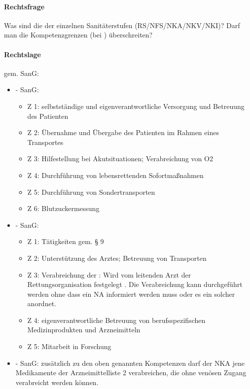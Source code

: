 \paragraph*{Rechtsfrage}

Was sind die  der einzelnen Sanitäterstufen
(RS/NFS/NKA/NKV/NKI)? Darf man die Kompetenzgrenzen (bei ) \"uberschreiten?

\paragraph*{Rechtslage}

 gem.  SanG:

\begin{itemize}
	\item {\mdseries
	 -  SanG:}

	\begin{itemize}
		\item {\mdseries
		Z 1: selbstständige und eigenverantwortliche Versorgung und Betreuung
		des Patienten}

		\item {\mdseries
		Z 2: \"Ubernahme und \"Ubergabe des Patienten im Rahmen
		eines Transportes}

		\item {\mdseries
		Z 3: Hilfestellung bei Akutsituationen; Verabreichung von O2}

		\item {\mdseries
		Z 4: Durchf\"uhrung von lebensrettenden Sofortma{\ss}nahmen}

		\item {\mdseries
		Z 5: Durchf\"uhrung von Sondertransporten}

		\item {\mdseries
		Z 6: Blutzuckermessung}

	\end{itemize}

	\item {} -  SanG:

	\begin{itemize}
		\item Z 1: Tätigkeiten gem. {\S} 9
		\item Z 2: Unterst\"utzung des Arztes; Betreuung von Transporten
		\item 
		Z 3: Verabreichung der : 
		Wird vom leitenden Arzt der Rettungsorganisation
		festgelegt . Die Verabreichung kann
		durchgef\"uhrt werden ohne dass ein NA informiert werden muss oder es
		ein solcher anordnet.
		\item Z 4: eigenverantwortliche Betreuung von berufsspezifischen
		Medizinprodukten und Arzneimitteln
		\item 	Z 5: Mitarbeit in Forschung
	\end{itemize}
	\item {} -  SanG:
	zusätzlich zu den oben genannten Kompetenzen darf der NKA jene
	Medikamente der Arzneimittelliste 2 verabreichen, die ohne ven\"osen
	Zugang verabreicht werden k\"onnen.
	

\end{itemize}
